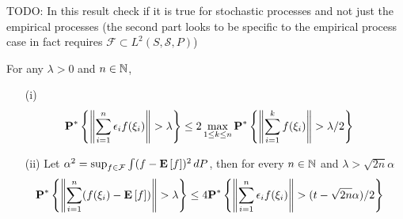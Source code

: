 TODO: In this result check if it is true for stochastic processes and not just the empirical processes (the second part looks to be specific to the empirical process case in fact requires $\mathcal{F} \subset L^2(S, \mathcal{S}, P)$)
\begin{lem}For any $\lambda > 0$ and $n \in \mathbb{N}$,
\begin{itemize}
\item[(i)]
\begin{align*}
\textbf{P}^* \left \{\left \lVert \sum_{i=1}^n \epsilon_i f(\xi_i) \right \rVert > \lambda \right \} &\leq 2 \max_{1 \leq k \leq n} \textbf{P}^* \left \{\left \lVert \sum_{i=1}^k f(\xi_i) \right \rVert > \lambda/2 \right \}
\end{align*}
\item[(ii)] Let $\alpha^2 = \sup_{f \in \mathcal{F}} \int (f - \textbf{E}\left[f\right])^2 \, dP$, then for every $n \in \mathbb{N}$ and $\lambda > \sqrt{2n} \alpha$ 
\begin{align*}
\textbf{P}^* \left \{\left \lVert \sum_{i=1}^n (f(\xi_i) - \textbf{E}\left[f\right]) \right \rVert > \lambda \right \} &\leq 
4 \textbf{P}^* \left \{\left \lVert \sum_{i=1}^n \epsilon_i f(\xi_i) \right \rVert > (t - \sqrt{2n} \alpha)/2 \right \}
\end{align*}
\end{itemize}
\end{lem}
